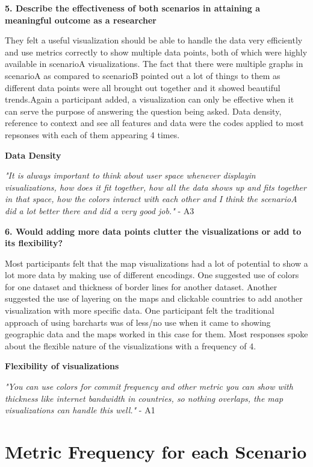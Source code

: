 \documentclass[seploa]{beavtex}
\begin{document}
\textbf{5. Describe the effectiveness of both scenarios in attaining a meaningful outcome as a researcher}

They felt a useful visualization should be able to handle the data very efficiently and use metrics correctly to show multiple data points, both of which were highly available in scenarioA visualizations. The fact that there were multiple graphs in scenarioA as compared to scenarioB pointed out a lot of things to them as different data points were all brought out together and it showed beautiful trends.Again a participant added, a visualization can only be effective when it can serve the purpose of answering the question being asked. Data density, reference to context and see all features and data were the codes applied to most repsonses with each of them appearing 4 times.

\textbf{Data Density}

{\em "It is always important to think about user space whenever displayin visualizations, how does it fit together, how all the data shows up and fits together in that space, how the colors interact with each other and I think the scenarioA did a lot better there and did a very good job."} - A3

\textbf{6. Would adding more data points clutter the visualizations or add to its flexibility?}

Most participants felt that the map visualizations had a lot of potential to show a lot more data by making use of different encodings. One suggested use of colors for one dataset and thickness of border lines for another dataset. Another suggested the use of layering on the maps and clickable countries to add another visualization with more specific data. One participant felt the traditional approach of using barcharts was of less/no use when it came to showing geographic data and the maps worked in this case for them. Most responses spoke about the flexible nature of the visualizations with a frequency of 4.

\textbf{Flexibility of visualizations}

{\em "You can use colors for commit frequency and other metric you can show with thickness like internet bandwidth in countries, so nothing overlaps, the map visualizations can handle this well."} - A1

\section{Metric Frequency for each Scenario}
\end{document}
